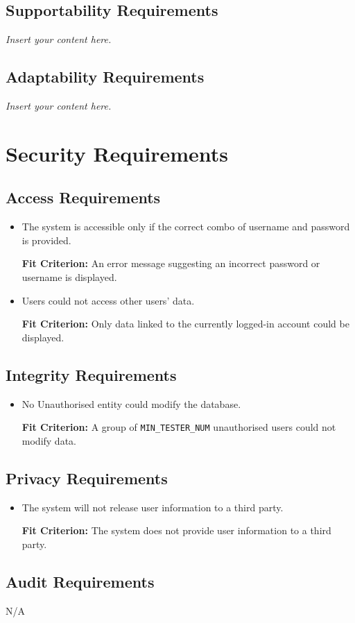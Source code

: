 \documentclass[12pt]{article}
\newcommand{\lips}{\textit{Insert your content here.}}
\newcounter{nfrnum} %
\newcommand{\rthenfrnum}{NFR\refstepcounter{nfrnum}\thenfrnum:}
\begin{document}
\subsection{Supportability Requirements}
\lips
\subsection{Adaptability Requirements}
\lips

\section{Security Requirements}
\subsection{Access Requirements}
\begin{itemize}
\item[\rthenfrnum]
The system is accessible only if the correct combo of username and password is provided.

\textbf{Fit Criterion:} An error message suggesting an incorrect password or username is displayed.
\item[\rthenfrnum]
Users could not access other users' data.

\textbf{Fit Criterion:} Only data linked to the currently logged-in account could be displayed.
\end{itemize}
\subsection{Integrity Requirements}
\begin{itemize}
\item[\rthenfrnum]
No Unauthorised entity could modify the database.

\textbf{Fit Criterion:} A group of \texttt{MIN\_TESTER\_NUM} unauthorised users could not modify data.
\end{itemize}
\subsection{Privacy Requirements}
\begin{itemize}
\item[\rthenfrnum]
The system will not release user information to a third party.

\textbf{Fit Criterion:} The system does not provide user information to a third party.
\end{itemize}
\subsection{Audit Requirements}
N/A
\end{document}
